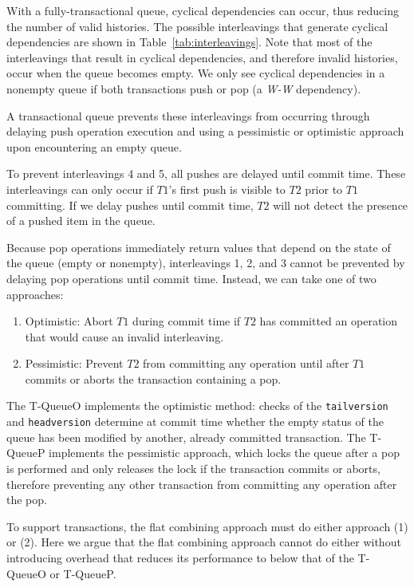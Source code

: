 With a fully-transactional queue, cyclical dependencies can occur, thus reducing the number of valid histories. The possible interleavings that generate cyclical dependencies are shown in Table~\ref{tab:interleavings}. Note that most of the interleavings that result in cyclical dependencies, and therefore invalid histories, occur when the queue becomes empty. 
We only see cyclical dependencies in a nonempty queue if both transactions push or pop (a \emph{W-W} dependency).

A transactional queue prevents these interleavings from occurring through delaying push operation execution and using a pessimistic or optimistic approach upon encountering an empty queue.

To prevent interleavings 4 and 5, all pushes are delayed until commit time. These interleavings can only occur if $T1$'s first push is visible to $T2$ prior to $T1$ committing. If we delay pushes until commit time, $T2$ will not detect the presence of a pushed item in the queue.

Because pop operations immediately return values that depend on the state of the queue (empty or nonempty), interleavings 1, 2, and 3 cannot be prevented by delaying pop operations until commit time. Instead, we can take one of two approaches:
\begin{enumerate}
    \item Optimistic: Abort $T1$ during commit time if $T2$ has committed an operation that would cause an invalid interleaving.
    \item Pessimistic: Prevent $T2$ from committing any operation until after $T1$ commits or aborts the transaction containing a pop.
\end{enumerate}

The T-QueueO implements the optimistic method: checks of the \texttt{tailversion} and \texttt{headversion} determine at commit time whether the empty status of the queue has been modified by another, already committed transaction. The T-QueueP implements the pessimistic approach, which locks the queue after a pop is performed and only releases the lock if the transaction commits or aborts, therefore preventing any other transaction from committing any operation after the pop.

To support transactions, the flat combining approach must do either approach (1) or (2). Here we argue that the flat combining approach cannot do either without introducing overhead that reduces its performance to below that of the T-QueueO or T-QueueP.

